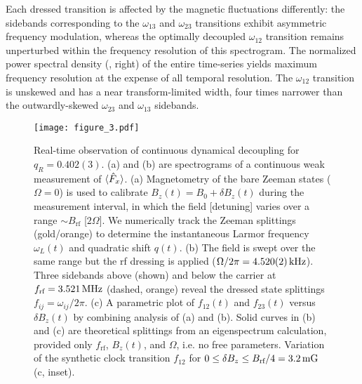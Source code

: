 \documentclass[aps,prl,reprint,superscriptaddress,floatfix]{revtex4-1}
\begin{document}
Each dressed transition is affected by the magnetic fluctuations differently: the sidebands corresponding to the $\omega_{13}$ and $\omega_{23}$ transitions exhibit asymmetric frequency modulation, whereas the optimally decoupled $\omega_{12}$ transition remains unperturbed within the frequency resolution of this spectrogram.
The normalized power spectral density (, right) of the entire time-series yields maximum frequency resolution at the expense of all temporal resolution.
The $\omega_{12}$ transition is unskewed and has a near transform-limited width, four times narrower than the outwardly-skewed $\omega_{23}$ and $\omega_{13}$ sidebands.
\begin{figure}
    \texttt{[image: figure\_3.pdf]}
    \caption{
    \label{fig:acquisition_pipeline}
        Real-time observation of continuous dynamical decoupling for $q_R = 0.402(3)$.
        (a) and (b) are spectrograms of a continuous weak measurement of $\langle \hat{F}_x \rangle$.
        (a) Magnetometry of the bare Zeeman states ($\Omega=0$) is used to calibrate $B_z(t) = B_0 + \delta B_z(t)$ during the measurement interval, in which the field [detuning] varies over a range $\sim B_{\text{rf}}$ [$2\Omega$].
        We numerically track the Zeeman splittings (gold/orange) to determine the instantaneous Larmor frequency $\omega_L(t)$ and quadratic shift $q(t)$.
       (b) The field is swept over the same range but the rf dressing is applied ($\Omega/2\pi = \unit[4.520(2)]{kHz}$).
       Three sidebands above (shown) and below the carrier at $f_{\text{rf}}=\unit[3.521]{MHz}$ (dashed, orange) reveal the dressed state splittings $f_{ij} = \omega_{ij}/2\pi$.
       (c) A parametric plot of $f_{12}(t)$ and $f_{23}(t)$ versus $\delta B_z(t)$ by combining analysis of (a) and (b).
       Solid curves in (b) and (c) are theoretical splittings from an eigenspectrum calculation, provided only $f_{\text{rf}}$, $B_z(t)$, and $\Omega$, i.e. no free parameters.
       Variation of the synthetic clock transition $f_{12}$ for $0 \leq \delta B_z \leq B_{\text{rf}}/4 = \unit[3.2]{mG}$ (c, inset).
    }
\end{figure}
\end{document}
